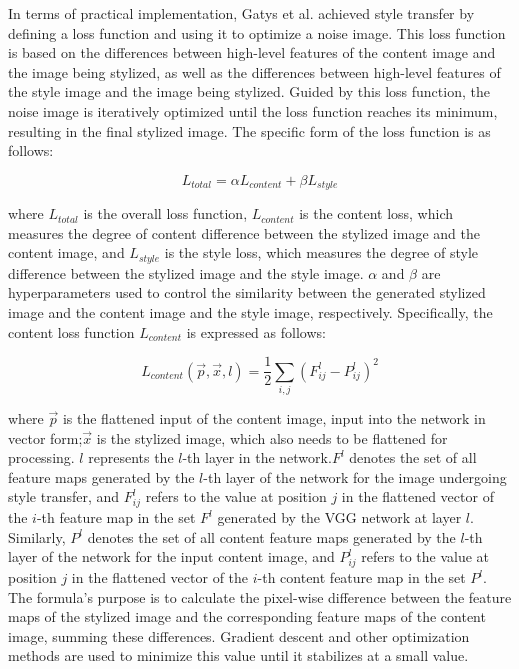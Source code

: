\documentclass[preprint,12pt]{elsarticle}
\begin{document}
In terms of practical implementation, Gatys et al.\citep{02gatys2016image} achieved style transfer by defining a loss function and using it to optimize a noise image. This loss function is based on the differences between high-level features of the content image and the image being stylized, as well as the differences between high-level features of the style image and the image being stylized. Guided by this loss function, the noise image is iteratively optimized until the loss function reaches its minimum, resulting in the final stylized image. The specific form of the loss function is as follows:

\begin{equation}
    \label{Gatys_total_loss}
    L_{total}=\alpha L_{content}+ \beta L_{style}
\end{equation}

where $L_{total}$  is the overall loss function, $L_{content}$ is the content loss, which measures the degree of content difference between the stylized image and the content image, and $L_{style}$  is the style loss, which measures the degree of style difference between the stylized image and the style image. $\alpha$ and $\beta$ are hyperparameters used to control the similarity between the generated stylized image and the content image and the style image, respectively. Specifically, the content loss function $L_{content}$  is expressed as follows:

\begin{equation}
    \label{gatys_content_l}
    L_{content}\left(\vec{p},\vec{x},l\right)=\frac{1}{2} \sum_{i,j} \left(F_{ij}^l-P_{ij}^l\right)^2
\end{equation}

where $\vec{p}$ is the flattened input of the content image, input into the network in vector form;$\vec{x}$ is the stylized image, which also needs to be flattened for processing. $l$ represents the $l$-th layer in the network.$F^l$ denotes the set of all feature maps generated by the $l$-th layer of the network for the image undergoing style transfer, and $F_{ij}^l$ refers to the value at position $j$ in the flattened vector of the $i$-th feature map in the set $F^l$ generated by the VGG \citep{25simonyan2014very} network at layer $l$. Similarly, $P^l$ denotes the set of all content feature maps generated by the $l$-th layer of the network for the input content image, and $P_{ij}^l$ refers to the value at position $j$ in the flattened vector of the $i$-th content feature map in the set $P^l$. The formula's purpose is to calculate the pixel-wise difference between the feature maps of the stylized image and the corresponding feature maps of the content image, summing these differences. Gradient descent and other optimization methods are used to minimize this value until it stabilizes at a small value.
\end{document}
